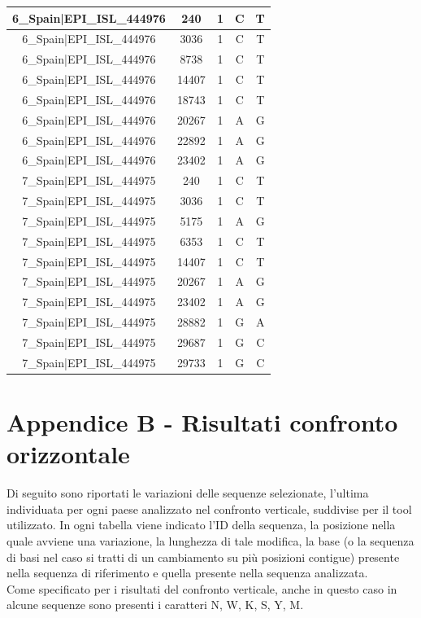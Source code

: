 \documentclass[a4paper,10pt]{article}
\begin{document}
\begin{longtable}{@{}ccccc@{}}
6\_Spain|EPI\_ISL\_444976 & 240 & 1 & C & T \\* \midrule
6\_Spain|EPI\_ISL\_444976 & 3036 & 1 & C & T \\* \midrule
6\_Spain|EPI\_ISL\_444976 & 8738 & 1 & C & T \\* \midrule
6\_Spain|EPI\_ISL\_444976 & 14407 & 1 & C & T \\* \midrule
6\_Spain|EPI\_ISL\_444976 & 18743 & 1 & C & T \\* \midrule
6\_Spain|EPI\_ISL\_444976 & 20267 & 1 & A & G \\* \midrule
6\_Spain|EPI\_ISL\_444976 & 22892 & 1 & A & G \\* \midrule
6\_Spain|EPI\_ISL\_444976 & 23402 & 1 & A & G \\* \midrule
7\_Spain|EPI\_ISL\_444975 & 240 & 1 & C & T \\* \midrule
7\_Spain|EPI\_ISL\_444975 & 3036 & 1 & C & T \\* \midrule
7\_Spain|EPI\_ISL\_444975 & 5175 & 1 & A & G \\* \midrule
7\_Spain|EPI\_ISL\_444975 & 6353 & 1 & C & T \\* \midrule
7\_Spain|EPI\_ISL\_444975 & 14407 & 1 & C & T \\* \midrule
7\_Spain|EPI\_ISL\_444975 & 20267 & 1 & A & G \\* \midrule
7\_Spain|EPI\_ISL\_444975 & 23402 & 1 & A & G \\* \midrule
7\_Spain|EPI\_ISL\_444975 & 28882 & 1 & G & A \\* \midrule
7\_Spain|EPI\_ISL\_444975 & 29687 & 1 & G & C \\* \midrule
7\_Spain|EPI\_ISL\_444975 & 29733 & 1 & G & C \\* \bottomrule
\end{longtable}

\newpage
\section{Appendice B - Risultati confronto orizzontale}
Di seguito sono riportati le variazioni delle sequenze selezionate, l'ultima individuata per ogni paese analizzato nel confronto verticale, suddivise per il tool utilizzato. In ogni tabella viene indicato l'ID della sequenza, la posizione nella quale avviene una variazione, la lunghezza di tale modifica,  la base (o la sequenza di basi nel caso si tratti di un cambiamento su più posizioni contigue) presente nella sequenza di riferimento e quella presente nella sequenza analizzata. \\
Come specificato per i risultati del confronto verticale, anche in questo caso in alcune sequenze sono presenti i caratteri N, W, K, S, Y, M. 
\end{document}
